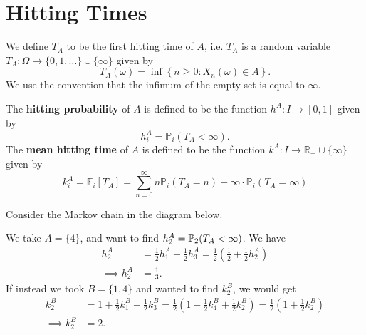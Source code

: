 \documentclass[a4paper]{article}
\begin{document}
\section{Hitting Times}

\begin{definition}
	We define $T_A$ to be the first hitting time of $A$, i.e. $T_A$ is a random variable $T_A: \Omega \rightarrow\{0,1, \ldots\} \cup\{\infty\}$ given by
    \[
    T_A(\omega)=\inf \left\{n \geq 0: X_n(\omega) \in A\right\} .
    \]
    We use the convention that the infimum of the empty set is equal to $\infty$.

    The \textbf{hitting probability} of $A$ is defined to be the function $h^A: I \rightarrow[0,1]$ given by
    \[
    h_i^A=\mathbb{P}_i\left(T_A<\infty\right) .
    \]
    The \textbf{mean hitting time} of $A$ is defined to be the function $k^A: I \rightarrow \mathbb{R}_{+} \cup\{\infty\}$ given by
    \[
    k_i^A=\mathbb{E}_i\left[T_A\right]=\sum_{n=0}^{\infty} n \mathbb{P}_i\left(T_A=n\right)+\infty \cdot \mathbb{P}_i\left(T_A=\infty\right)
    \]
\end{definition}

\begin{example}
	Consider the Markov chain in the diagram below.
	\begin{center}
		\end{center}

		We take $A = \{4\}$, and want to find $h_2^A = {\mathbb{P}}_2(T_A < \infty)$. We have
		\begin{align*}
			h_2^A &= \frac{1}{2}h_1^A +
			\frac{1}{2}h_3^A =\frac{1}{2}\left( \frac{1}{2}+\frac{1}{2}h_2^A \right) \\
		\implies h_2^A &= \frac{1}{3}.
		\end{align*}
		If instead we took $B = \{1, 4\}$ and wanted to find $k_2^B$, we would get
		\begin{align*}
			k_2^B &= 1+\frac{1}{2}k_1^B+\frac{1}{2}k_3^B=\frac{1}{2}\left( 1+\frac{1}{2}k_4^B+\frac{1}{2}k_2^B \right)=\frac{1}{2}\left( 1+\frac{1}{2}k_2^B \right)\\
	\implies k_2^B &= 2.
		\end{align*}
\end{example}
\end{document}
